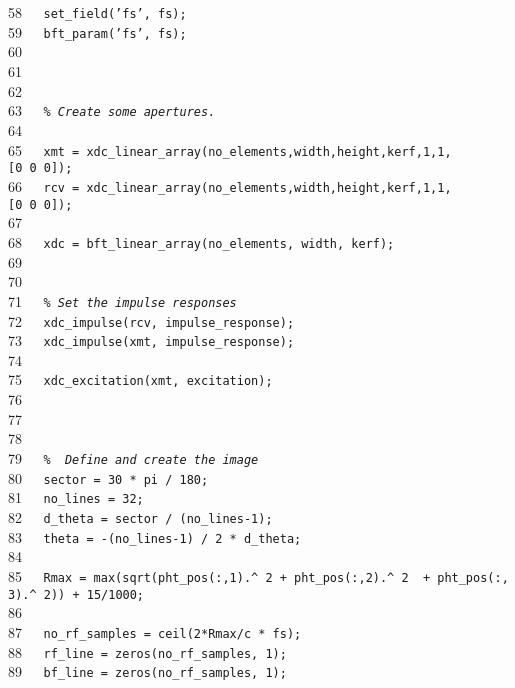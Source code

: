 \documentclass{manual}
\begin{document}
{58{\tt~~~}{\tt set\_field('fs',~fs);}\\
59{\tt~~~}{\tt bft\_param('fs',~fs);}\\
60{\tt~~~}{\tt }\\
61{\tt~~~}{\tt }\\
62{\tt~~~}{\tt }\\
63{\tt~~~}{\tt {\sl \%~Create~some~apertures.}}\\
64{\tt~~~}{\tt }\\
65{\tt~~~}{\tt xmt~=~xdc\_linear\_array(no\_elements,width,height,kerf,1,1,[0~0~0]);}\\
66{\tt~~~}{\tt rcv~=~xdc\_linear\_array(no\_elements,width,height,kerf,1,1,[0~0~0]);}\\
67{\tt~~~}{\tt }\\
68{\tt~~~}{\tt xdc~=~bft\_linear\_array(no\_elements,~width,~kerf);}\\
69{\tt~~~}{\tt }\\
70{\tt~~~}{\tt }\\
71{\tt~~~}{\tt {\sl \%~Set~the~impulse~responses}}\\
72{\tt~~~}{\tt xdc\_impulse(rcv,~impulse\_response);}\\
73{\tt~~~}{\tt xdc\_impulse(xmt,~impulse\_response);}\\
74{\tt~~~}{\tt }\\
75{\tt~~~}{\tt xdc\_excitation(xmt,~excitation);}\\
76{\tt~~~}{\tt }\\
77{\tt~~~}{\tt }\\
78{\tt~~~}{\tt }\\
79{\tt~~~}{\tt {\sl \%~~Define~and~create~the~image}}\\
80{\tt~~~}{\tt sector~=~30~*~pi~/~180;}\\
81{\tt~~~}{\tt no\_lines~=~32;}\\
82{\tt~~~}{\tt d\_theta~=~sector~/~(no\_lines-1);}\\
83{\tt~~~}{\tt theta~=~-(no\_lines-1)~/~2~*~d\_theta;}\\
84{\tt~~~}{\tt }\\
85{\tt~~~}{\tt Rmax~=~max(sqrt(pht\_pos(:,1).\^~2~+~pht\_pos(:,2).\^~2~~+~pht\_pos(:,3).\^~2))~+~15/1000;}\\
86{\tt~~~}{\tt }\\
87{\tt~~~}{\tt no\_rf\_samples~=~ceil(2*Rmax/c~*~fs);}\\
88{\tt~~~}{\tt rf\_line~=~zeros(no\_rf\_samples,~1);}\\
89{\tt~~~}{\tt bf\_line~=~zeros(no\_rf\_samples,~1);}\\
}
\end{document}
